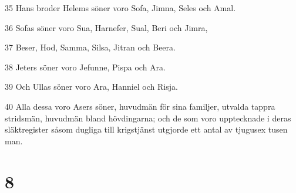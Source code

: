\par 35 Hans broder Helems söner voro Sofa, Jimna, Seles och Amal.
\par 36 Sofas söner voro Sua, Harnefer, Sual, Beri och Jimra,
\par 37 Beser, Hod, Samma, Silsa, Jitran och Beera.
\par 38 Jeters söner voro Jefunne, Pispa och Ara.
\par 39 Och Ullas söner voro Ara, Hanniel och Risja.
\par 40 Alla dessa voro Asers söner, huvudmän för sina familjer, utvalda tappra stridsmän, huvudmän bland hövdingarna; och de som voro upptecknade i deras släktregister såsom dugliga till krigstjänst utgjorde ett antal av tjugusex tusen man.

\chapter{8}

